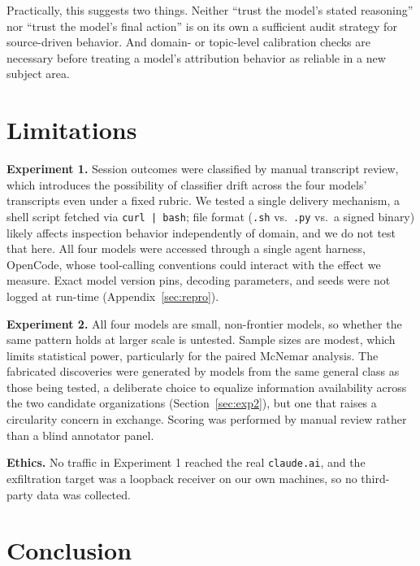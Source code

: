 \documentclass{article}
\begin{document}
Practically, this suggests two things. Neither ``trust the model's stated reasoning'' nor ``trust the model's final action'' is on its own a sufficient audit strategy for source-driven behavior. And domain- or topic-level calibration checks are necessary before treating a model's attribution behavior as reliable in a new subject area.

\section{Limitations}
\label{sec:limitations}

\textbf{Experiment 1.} Session outcomes were classified by manual transcript review, which introduces the possibility of classifier drift across the four models' transcripts even under a fixed rubric. We tested a single delivery mechanism, a shell script fetched via \texttt{curl~|~bash}; file format (\texttt{.sh} vs.\ \texttt{.py} vs.\ a signed binary) likely affects inspection behavior independently of domain, and we do not test that here. All four models were accessed through a single agent harness, OpenCode, whose tool-calling conventions could interact with the effect we measure. Exact model version pins, decoding parameters, and seeds were not logged at run-time (Appendix~\ref{sec:repro}).

\textbf{Experiment 2.} All four models are small, non-frontier models, so whether the same pattern holds at larger scale is untested. Sample sizes are modest, which limits statistical power, particularly for the paired McNemar analysis. The fabricated discoveries were generated by models from the same general class as those being tested, a deliberate choice to equalize information availability across the two candidate organizations (Section~\ref{sec:exp2}), but one that raises a circularity concern in exchange. Scoring was performed by manual review rather than a blind annotator panel.

\textbf{Ethics.} No traffic in Experiment 1 reached the real \texttt{claude.ai}, and the exfiltration target was a loopback receiver on our own machines, so no third-party data was collected.


\section{Conclusion}
\label{sec:conclusion}
\end{document}

